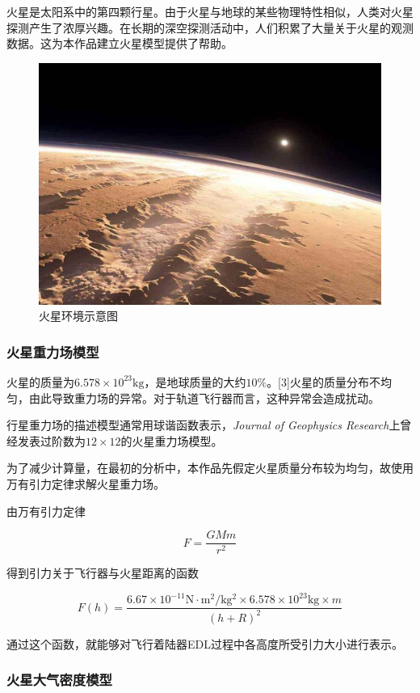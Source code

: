 \documentclass[UTF8,12pt]{ctexart}
\begin{document}
	火星是太阳系中的第四颗行星。由于火星与地球的某些物理特性相似，人类对火星探测产生了浓厚兴趣。在长期的深空探测活动中，人们积累了大量关于火星的观测数据。这为本作品建立火星模型提供了帮助。
	\begin{figure}[htb]
		\centering
		\includegraphics[width=0.6\linewidth]{火星大气环境.png}
		\caption{火星环境示意图}
		\label{fig}	
	\end{figure}
	\subsubsection{火星重力场模型}
	
	火星的质量为$6.578\times10^{23}\mathrm{kg}$，是地球质量的大约$10\%$。[3]火星的质量分布不均匀，由此导致重力场的异常。对于轨道飞行器而言，这种异常会造成扰动。
	
	行星重力场的描述模型通常用球谐函数表示，\textit{Journal  of Geophysics Research}上曾经发表过阶数为$12\times12$的火星重力场模型。
	
	为了减少计算量，在最初的分析中，本作品先假定火星质量分布较为均匀，故使用万有引力定律求解火星重力场。
	
	由万有引力定律
	
	\begin{equation}
		F=\frac{GMm}{r^2}
	\end{equation}
	
	得到引力关于飞行器与火星距离的函数
	
	\begin{equation}
	F(h)=\frac{6.67\times10^{-11}\mathrm{N\cdot m^2/kg^2}\times6.578\times10^{23}\mathrm{kg}\times m}{(h+R)^2}
	\end{equation}
	
	通过这个函数，就能够对飞行着陆器EDL过程中各高度所受引力大小进行表示。
	
	\subsubsection{火星大气密度模型}
	
\end{document}
